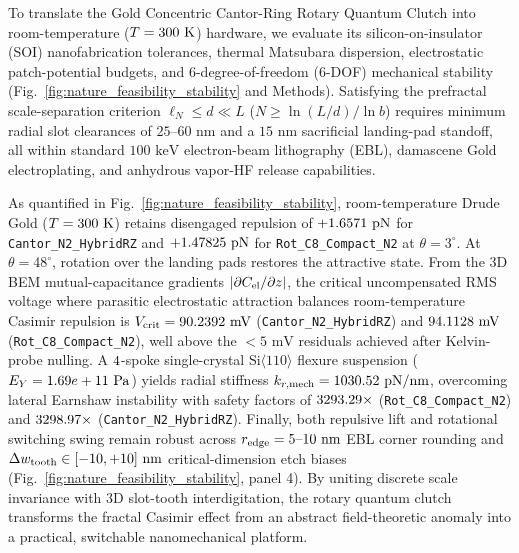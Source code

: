 \documentclass[11pt,letterpaper]{article}
\begin{document}
To translate the Gold Concentric Cantor-Ring Rotary Quantum Clutch into room-temperature ($T = 300{}\text{ K}$) hardware, we evaluate its silicon-on-insulator (SOI) nanofabrication tolerances, thermal Matsubara dispersion, electrostatic patch-potential budgets, and 6-degree-of-freedom (6-DOF) mechanical stability (Fig.~\ref{fig:nature_feasibility_stability} and Methods). Satisfying the prefractal scale-separation criterion\cite{gordon2026prd} $\ell_N \le d \ll L$ ($N \ge \ln(L/d)/\ln b$) requires minimum radial slot clearances of $25\text{--}60\text{ nm}$ and a $15\text{ nm}$ sacrificial landing-pad standoff, all within standard $100\text{ keV}$ electron-beam lithography (EBL), damascene Gold electroplating, and anhydrous vapor-HF release capabilities.

As quantified in Fig.~\ref{fig:nature_feasibility_stability}, room-temperature Drude Gold ($T = 300{}\text{ K}$) retains disengaged repulsion of $+1.6571{}\text{ pN}$ for \texttt{Cantor\_N2\_HybridRZ} and $+1.47825{}\text{ pN}$ for \texttt{Rot\_C8\_Compact\_N2} at $\theta=3^\circ$. At $\theta=48^\circ$, rotation over the landing pads restores the attractive state. From the 3D BEM mutual-capacitance gradients $|\partial C_{\rm el}/\partial z|$, the critical uncompensated RMS voltage where parasitic electrostatic attraction balances room-temperature Casimir repulsion is $V_{\rm crit} = 90.2392{}\text{ mV}$ (\texttt{Cantor\_N2\_HybridRZ}) and $94.1128{}\text{ mV}$ (\texttt{Rot\_C8\_Compact\_N2}), well above the $<5\text{ mV}$ residuals achieved after Kelvin-probe nulling. A $4{}$-spoke single-crystal $\text{Si}\langle 110\rangle$ flexure suspension ($E_Y = 1.69e+11{}\text{ Pa}$) yields radial stiffness $k_{r,\rm mech} = 1030.52{}\text{ pN/nm}$, overcoming lateral Earnshaw instability with safety factors of $3293.29{}\times$ (\texttt{Rot\_C8\_Compact\_N2}) and $3298.97{}\times$ (\texttt{Cantor\_N2\_HybridRZ}). Finally, both repulsive lift and rotational switching swing remain robust across $r_{\rm edge} = 5\text{--}10\text{ nm}$ EBL corner rounding and $\Delta w_{\rm tooth} \in [-10, +10]\text{ nm}$ critical-dimension etch biases (Fig.~\ref{fig:nature_feasibility_stability}, panel 4). By uniting discrete scale invariance with 3D slot-tooth interdigitation, the rotary quantum clutch transforms the fractal Casimir effect from an abstract field-theoretic anomaly into a practical, switchable nanomechanical platform.
\end{document}

